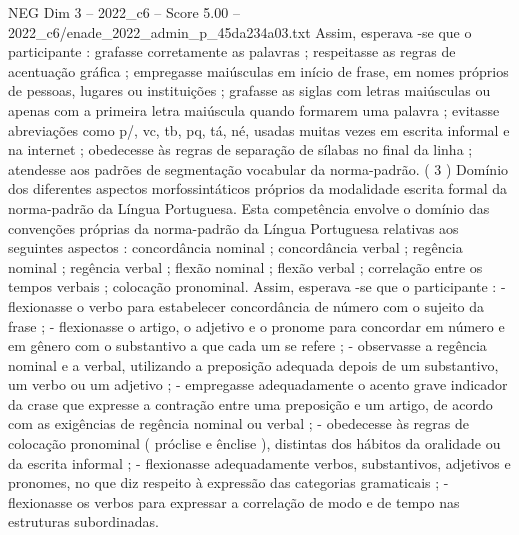 \begin{textsample}{NEG Dim 3 – 2022\_c6 – Score 5.00 – 2022\_c6/enade\_2022\_admin\_p\_45da234a03.txt}
Assim, esperava -se que o participante : grafasse corretamente as palavras ; respeitasse as regras de acentuação gráfica ; empregasse maiúsculas em início de frase, em nomes próprios de pessoas, lugares ou instituições ; grafasse as siglas com letras maiúsculas ou apenas com a primeira letra maiúscula quando formarem uma palavra ; evitasse abreviações como p/, vc, tb, pq, tá, né, usadas muitas vezes em escrita informal e na internet ; obedecesse às regras de separação de sílabas no final da linha ; atendesse aos padrões de segmentação vocabular da norma-padrão. ( 3 ) Domínio dos diferentes aspectos morfossintáticos próprios da modalidade escrita formal da norma-padrão da Língua Portuguesa.
Esta competência envolve o domínio das convenções próprias da norma-padrão da Língua Portuguesa relativas aos seguintes aspectos : concordância nominal ; concordância verbal ; regência nominal ; regência verbal ; flexão nominal ; flexão verbal ; correlação entre os tempos verbais ; colocação pronominal.
Assim, esperava -se que o participante : - flexionasse o verbo para estabelecer concordância de número com o sujeito da frase ; - flexionasse o artigo, o adjetivo e o pronome para concordar em número e em gênero com o substantivo a que cada um se refere ; - observasse a regência nominal e a verbal, utilizando a preposição adequada depois de um substantivo, um verbo ou um adjetivo ; - empregasse adequadamente o acento grave indicador da crase que expresse a contração entre uma preposição e um artigo, de acordo com as exigências de regência nominal ou verbal ; - obedecesse às regras de colocação pronominal ( próclise e ênclise ), distintas dos hábitos da oralidade ou da escrita informal ; - flexionasse adequadamente verbos, substantivos, adjetivos e pronomes, no que diz respeito à expressão das categorias gramaticais ; - flexionasse os verbos para expressar a correlação de modo e de tempo nas estruturas subordinadas.

\end{textsample}
